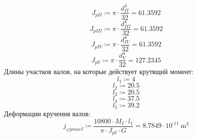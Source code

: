 \documentclass{article}
\newcommand{\defeq}{\coloneq} %
\begin{document}
\begin{equation*}
J_{pII} \defeq {\pi} \cdot \frac{d_{II}^{4}}{32} = {61.3592}
\end{equation*}
\begin{equation*}
J_{pIII} \defeq {\pi} \cdot \frac{d_{III}^{4}}{32} = {61.3592}
\end{equation*}
\begin{equation*}
J_{pIV} \defeq {\pi} \cdot \frac{d_{IV}^{4}}{32} = {61.3592}
\end{equation*}
\begin{equation*}
J_{pV} \defeq {\pi} \cdot \frac{d_{V}^{4}}{32} = {127.2345}
\end{equation*}
\colorbox[HTML]{000000}{Длины участков валов, на которые действует крутящий момент:}\newline
\begin{equation*}
\textit{l}_{\textit{1}} \defeq 4
\end{equation*}
\begin{equation*}
\textit{l}_{\textit{2}} \defeq 20.5
\end{equation*}
\begin{equation*}
\textit{l}_{\textit{3}} \defeq 20.5
\end{equation*}
\begin{equation*}
\textit{l}_{\textit{4}} \defeq 37.5
\end{equation*}
\begin{equation*}
\textit{l}_{\textit{5}} \defeq 39.2
\end{equation*}
\colorbox[HTML]{000000}{Деформации кручения валов:}\newline
\begin{equation*}
j_{φymaxI} \defeq \frac{10800 \cdot M_{I} \cdot \textit{l}_{\textit{1}}}{{\pi} \cdot J_{pI} \cdot G} = {8.7849 \cdot 10^{ \operatorname{-} 11} \: \mathrm{m}^{3}}
\end{equation*}
\end{document}
